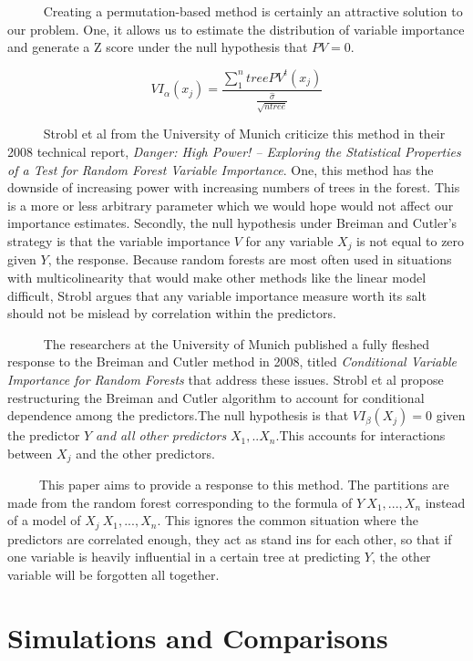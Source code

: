 \documentclass[12pt,twoside]{reedthesis}
\begin{document}
  ~~~~~ Creating a permutation-based method is certainly an attractive
  solution to our problem. One, it allows us to estimate the distribution
  of variable importance and generate a Z score under the null hypothesis
  that \(PV = 0\).
  
  \[VI_{\alpha}(x_j) = \frac{\sum_1^ntree PV^t(x_j)}{\frac{\hat{\sigma}}{\sqrt{ntree}}}\]
  
  ~~~~~ Strobl et al from the University of Munich criticize this method
  in their 2008 technical report, \emph{Danger: High Power! -- Exploring
  the Statistical Properties of a Test for Random Forest Variable
  Importance}. One, this method has the downside of increasing power with
  increasing numbers of trees in the forest. This is a more or less
  arbitrary parameter which we would hope would not affect our importance
  estimates. Secondly, the null hypothesis under Breiman and Cutler's
  strategy is that the variable importance \(V\) for any variable \(X_j\)
  is not equal to zero given \(Y\), the response. Because random forests
  are most often used in situations with multicolinearity that would make
  other methods like the linear model difficult, Strobl argues that any
  variable importance measure worth its salt should not be mislead by
  correlation within the predictors.
  
  ~~~~~ The researchers at the University of Munich published a fully
  fleshed response to the Breiman and Cutler method in 2008, titled
  \emph{Conditional Variable Importance for Random Forests} that address
  these issues. Strobl et al propose restructuring the Breiman and Cutler
  algorithm to account for conditional dependence among the predictors.The
  null hypothesis is that \(VI_{\beta}(X_j) = 0\) given the predictor
  \(Y\) \emph{and all other predictors} \(X_1,..X_n\).This accounts for
  interactions between \(X_j\) and the other predictors.
  
  ~~~~~This paper aims to provide a response to this method. The
  partitions are made from the random forest corresponding to the formula
  of \(Y~X_1,...,X_n\) instead of a model of \(X_j~X_1,...,X_n\). This
  ignores the common situation where the predictors are correlated enough,
  they act as stand ins for each other, so that if one variable is heavily
  influential in a certain tree at predicting \(Y\), the other variable
  will be forgotten all together.
  
  \chapter{Simulations and Comparisons}\label{simulations-and-comparisons}
  
\end{document}
